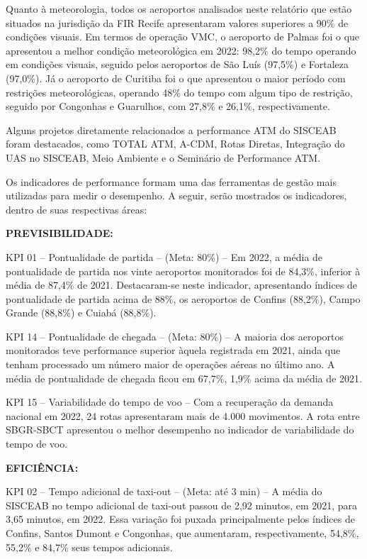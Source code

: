 \documentclass[
]{book}
\begin{document}
Quanto à meteorologia, todos os aeroportos analisados neste relatório que estão situados na jurisdição da FIR Recife apresentaram valores superiores a 90\% de condições visuais. Em termos de operação VMC, o aeroporto de Palmas foi o que apresentou a melhor condição meteorológica em 2022: 98,2\% do tempo operando em condições visuais, seguido pelos aeroportos de São Luís (97,5\%) e Fortaleza (97,0\%). Já o aeroporto de Curitiba foi o que apresentou o maior período com restrições meteorológicas, operando 48\% do tempo com algum tipo de restrição, seguido por Congonhas e Guarulhos, com 27,8\% e 26,1\%, respectivamente.

Alguns projetos diretamente relacionados a performance ATM do SISCEAB foram destacados, como TOTAL ATM, A-CDM, Rotas Diretas, Integração do UAS no SISCEAB, Meio Ambiente e o Seminário de Performance ATM.

Os indicadores de performance formam uma das ferramentas de gestão mais utilizadas para medir o desempenho. A seguir, serão mostrados os indicadores, dentro de suas respectivas áreas:

\textbf{PREVISIBILIDADE:}

KPI 01 -- Pontualidade de partida -- (Meta: 80\%) -- Em 2022, a média de pontualidade de partida nos vinte aeroportos monitorados foi de 84,3\%, inferior à média de 87,4\% de 2021. Destacaram-se neste indicador, apresentando índices de pontualidade de partida acima de 88\%, os aeroportos de Confins (88,2\%), Campo Grande (88,8\%) e Cuiabá (88,8\%).

KPI 14 -- Pontualidade de chegada -- (Meta: 80\%) -- A maioria dos aeroportos monitorados teve performance superior àquela registrada em 2021, ainda que tenham processado um número maior de operações aéreas no último ano. A média de pontualidade de chegada ficou em 67,7\%, 1,9\% acima da média de 2021.

KPI 15 -- Variabilidade do tempo de voo -- Com a recuperação da demanda nacional em 2022, 24 rotas apresentaram mais de 4.000 movimentos. A rota entre SBGR-SBCT apresentou o melhor desempenho no indicador de variabilidade do tempo de voo.

\textbf{EFICIÊNCIA:}

KPI 02 -- Tempo adicional de taxi-out -- (Meta: até 3 min) -- A média do SISCEAB no tempo adicional de taxi-out passou de 2,92 minutos, em 2021, para 3,65 minutos, em 2022. Essa variação foi puxada principalmente pelos índices de Confins, Santos Dumont e Congonhas, que aumentaram, respectivamente, 54,8\%, 55,2\% e 84,7\% seus tempos adicionais.
\end{document}
